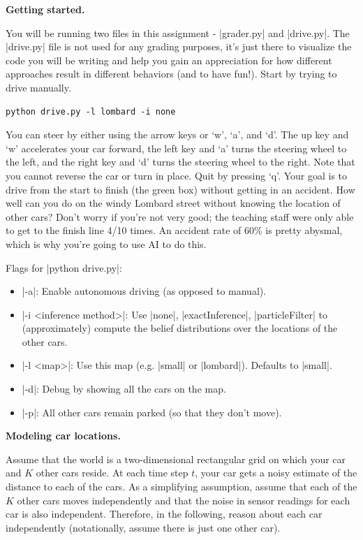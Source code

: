 {\bf Getting started.}

You will be running two files in this assignment - |grader.py| and |drive.py|.
The |drive.py| file is not used for any grading purposes, it's just there to
visualize the code you will be writing and help you gain an appreciation for how
different approaches result in different behaviors (and to have fun!). Start by
trying to drive manually.

\begin{lstlisting}
python drive.py -l lombard -i none
\end{lstlisting}

You can steer by either using the arrow keys or `w', `a', and `d'. The up key
and `w' accelerates your car forward, the left key and `a' turns the steering
wheel to the left, and the right key and `d' turns the steering wheel to the
right. Note that you cannot reverse the car or turn in place. Quit by pressing
`q'. Your goal is to drive from the start to finish (the green box) without
getting in an accident. How well can you do on the windy Lombard street without
knowing the location of other cars?  Don't worry if you're not very good; the
teaching staff were only able to get to the finish line 4/10 times.  An accident
rate of 60\% is pretty abysmal, which is why you're going to use AI to do this. 

Flags for |python drive.py|:
\begin{itemize}
  \item |-a|: Enable autonomous driving (as opposed to manual).
  \item |-i <inference method>|: Use |none|, |exactInference|, |particleFilter|
  to (approximately) compute the belief distributions over the locations of the
  other cars.
  \item |-l <map>|: Use this map (e.g. |small| or |lombard|). Defaults to
  |small|.
  \item |-d|: Debug by showing all the cars on the map.
  \item |-p|: All other cars remain parked (so that they don't move).
\end{itemize}
\clearpage

{\bf Modeling car locations.}

Assume that the world is a two-dimensional rectangular grid on which your car
and $K$ other cars reside. At each time step $t$, your car gets a noisy estimate
of the distance to each of the cars.  As a simplifying assumption, assume
that each of the $K$ other cars moves independently and that the noise in sensor
readings for each car is also independent. Therefore, in the following, 
reason about each car independently (notationally, assume there is just
one other car).

